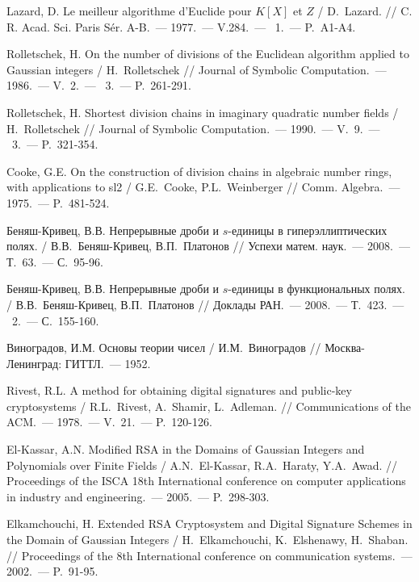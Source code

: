 \documentclass[_00_dissertation.tex]{subfiles}
\begin{document}
\begin{thebibliography}{99}
    Lazard, D. Le meilleur algorithme d'{E}uclide pour {$K[X]$} et {$Z$} / D.~Lazard. // C. R. Acad. Sci. Paris S\'er. A-B.~--- 1977.~--- V.284.~--- \textnumero~1.~--- P.~A1-A4.

    Rolletschek, H. On the number of divisions of the Euclidean algorithm applied to Gaussian integers / H.~Rolletschek // Journal of Symbolic Computation.~--- 1986.~--- V.~2.~--- \textnumero~3.~--- P.~261-291.
    
    Rolletschek, H. Shortest division chains in imaginary quadratic number fields / H.~Rolletschek // Journal of Symbolic Computation.~--- 1990.~--- V.~9.~--- \textnumero~3.~--- P.~321-354.

    Cooke, G.E. On the construction of division chains in algebraic number rings, with applications to sl2 / G.E.~Cooke, P.L.~Weinberger // Comm. Algebra.~--- 1975.~--- P.~481-524.

    Беняш-Кривец, В.В. Непрерывные дроби и $s$-единицы в гиперэллиптических полях. / В.В.~Беняш-Кривец, В.П.~Платонов // Успехи матем. наук.~--- 2008.~--- Т.~63.~--- С.~95-96.
    
    Беняш-Кривец, В.В. Непрерывные дроби и $s$-единицы в функциональных полях. / В.В.~Беняш-Кривец, В.П.~Платонов // Доклады РАН.~--- 2008.~--- Т.~423.~--- \textnumero~2.~--- С.~155-160.

    Виноградов, И.М. Основы теории чисел / И.М.~Виноградов // Москва-Ленинград: ГИТТЛ.~--- 1952.

    Rivest, R.L. A method for obtaining digital signatures and public-key cryptosystems / R.L.~Rivest, A.~Shamir, L.~Adleman. // Communications of the ACM.~--- 1978.~--- V.~21.~--- P.~120-126.

    El-Kassar, A.N. Modified RSA in the Domains of Gaussian Integers and Polynomials over Finite Fields / A.N.~El-Kassar, R.A.~Haraty, Y.A.~Awad. // Proceedings of the ISCA 18th International conference on computer applications in industry and engineering.~--- 2005.~--- P.~298-303.

    Elkamchouchi, H. Extended RSA Cryptosystem and Digital Signature Schemes in the Domain of Gaussian Integers / H.~Elkamchouchi, K.~Elshenawy, H.~Shaban. // Proceedings of the 8th International conference on communication systems.~--- 2002.~--- P.~91-95.


\end{thebibliography}
\end{document}
